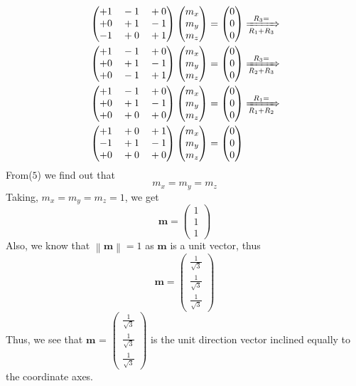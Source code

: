 \documentclass{article}
\newcommand{\myvec}[1]{\ensuremath{\begin{pmatrix}#1\end{pmatrix}}}
\newcommand{\norm}[1]{\left\lVert#1\right\rVert}
\let\vec\mathbf
\begin{document}
\begin{align}
& \myvec{+1 \quad  -1 \quad +0 \\ +0 \quad +1 \quad -1 \\ -1 \quad +0 \quad +1 }\myvec{m_x \\ m_y \\ m_z} = \myvec{0 \\ 0 \\ 0}  \xRightarrow[R_1+R_3]{R_3=} \\
& \myvec{+1 \quad  -1 \quad +0 \\ +0 \quad +1 \quad -1 \\ +0 \quad -1 \quad +1 }\myvec{m_x \\ m_y \\ m_z} = \myvec{0 \\ 0 \\ 0} 
\xRightarrow[R_2+R_3]{R_3=} \\
& \myvec{+1 \quad  -1 \quad +0 \\ +0 \quad +1 \quad -1 \\ +0 \quad +0 \quad +0 }\myvec{m_x \\ m_y \\ m_z} = \myvec{0 \\ 0 \\ 0} 
\xRightarrow[R_1+R_2]{R_1=} \\
& \myvec{+1 \quad  +0 \quad +1 \\ -1 \quad +1 \quad -1 \\ +0 \quad +0 \quad +0 }\myvec{m_x \\ m_y \\ m_z} = \myvec{0 \\ 0 \\ 0}
\end{align}
From($5$) we find out that
\begin{equation*}
m_x = m_y = m_z
\end{equation*}
Taking, $m_x = m_y = m_z =1$, we get
\begin{equation*}
\vec{m} = \myvec{1 \\ 1 \\1}
\end{equation*}
Also, we know that $\norm{\vec{m}}=1$ as $\vec{m}$ is a unit vector, thus
\begin{equation*}
\vec{m} = \myvec{\frac{1}{\sqrt{3}} \\ \frac{1}{\sqrt{3}} \\ \frac{1}{\sqrt{3}}}
\end{equation*}
Thus, we see that  $\vec{m}$ = $\myvec{ \frac{1}{\sqrt{3}} \\ \frac{1}{\sqrt{3}} \\ \frac{1}{\sqrt{3}}}$ is the unit direction vector inclined equally to the coordinate axes.\\
\end{document}
